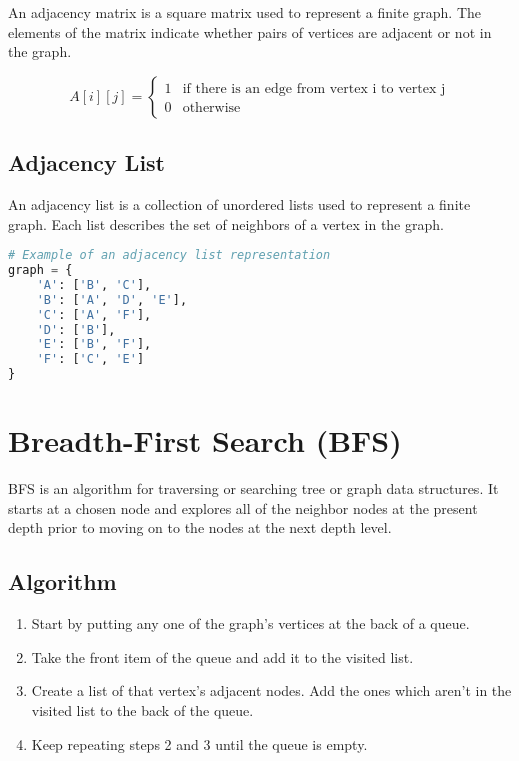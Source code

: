 \documentclass{article}
\begin{document}
An adjacency matrix is a square matrix used to represent a finite graph. The elements of the matrix indicate whether pairs of vertices are adjacent or not in the graph.

$$
A[i][j] = 
\begin{cases} 
1 & \text{if there is an edge from vertex i to vertex j} \\
0 & \text{otherwise}
\end{cases}
$$

\subsection{Adjacency List}

An adjacency list is a collection of unordered lists used to represent a finite graph. Each list describes the set of neighbors of a vertex in the graph.

\begin{lstlisting}[language=python]
# Example of an adjacency list representation
graph = {
    'A': ['B', 'C'],
    'B': ['A', 'D', 'E'],
    'C': ['A', 'F'],
    'D': ['B'],
    'E': ['B', 'F'],
    'F': ['C', 'E']
}
\end{lstlisting}

\section{Breadth-First Search (BFS)}

BFS is an algorithm for traversing or searching tree or graph data structures. It starts at a chosen node and explores all of the neighbor nodes at the present depth prior to moving on to the nodes at the next depth level.

\subsection{Algorithm}

\begin{enumerate}
  \item Start by putting any one of the graph's vertices at the back of a queue.
  \item Take the front item of the queue and add it to the visited list.
  \item Create a list of that vertex's adjacent nodes. Add the ones which aren't in the visited list to the back of the queue.
  \item Keep repeating steps 2 and 3 until the queue is empty.
\end{enumerate}
\end{document}
